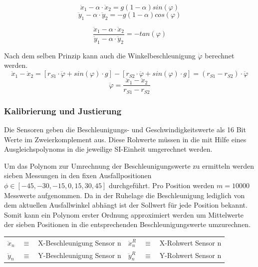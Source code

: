 \begin{equation}
\ddot{x}_1 - \alpha \cdot \ddot{x}_2 = 
g(1 - \alpha)sin(\varphi)
\end{equation}
\begin{equation}
\ddot{y}_1 - \alpha \cdot \ddot{y}_2 = 
-g(1- \alpha)cos(\varphi)
\end{equation}

\begin{equation}
\frac{\ddot{x}_1 - \alpha \cdot \ddot{x}_2}{\ddot{y}_1 - \alpha \cdot \ddot{y}_2} = -tan(\varphi)
\end{equation}

Nach dem selben Prinzip kann auch die Winkelbeschleunigung $\ddot{\varphi}$ berechnet werden.
\begin{equation}
\ddot{x}_1 - \ddot{x}_2 = [r_{S1} \cdot \ddot{\varphi} + sin(\varphi) \cdot g] - [r_{S2} \cdot \ddot{\varphi} + sin(\varphi) \cdot g] = (r_{S1} - r_{S2}) \cdot \ddot{\varphi}
\end{equation}
\begin{equation}
\ddot{\varphi} = \frac{\ddot{x}_1 - \ddot{x}_2}{r_{S1} - r_{S2}}
\end{equation}

\subsubsection{Kalibrierung und Justierung}
Die Sensoren geben die Beschleunigungs- und Geschwindigkeitswerte als 16 Bit Werte im Zweierkomplement aus. Diese Rohwerte müssen in die mit Hilfe eines Ausgleichspolynoms in die jeweilige SI-Einheit umgerechnet werden. 

Um das Polynom zur Umrechnung der Beschleunigungswerte zu ermitteln werden sieben Messungen in den fixen Ausfallpositionen $\phi \in [-45, -30, -15, 0, 15, 30, 45]$ durchgeführt. Pro Position werden $m = 10000$ Messwerte aufgenommen. Da in der Ruhelage die Beschleunigung lediglich von dem aktuellen Ausfallwinkel abhängt ist der Sollwert für jede Position bekannt. Somit kann ein Polynom erster Ordnung approximiert werden um Mittelwerte der sieben Positionen in die entsprechenden Beschleunigungswerte umzurechnen.

\begin{table}[h]
\centering
\begin{tabular}{lcllcl}
$\ddot{x}_n$ &$\equiv$& X-Beschleunigung Sensor n &
$\ddot{x}^R_n$ &$\equiv$& X-Rohwert Sensor n \\
$\ddot{y}_n$ &$\equiv$& Y-Beschleunigung Sensor n &
$\ddot{y}^R_n$ &$\equiv$& Y-Rohwert Sensor n
\end{tabular}
\end{table}

